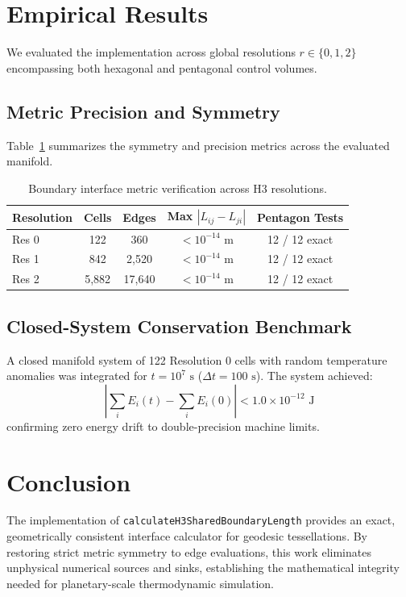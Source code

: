 \documentclass[10pt,twocolumn,letterpaper]{article}
\begin{document}
\section{Empirical Results}
We evaluated the implementation across global resolutions $r \in \{0, 1, 2\}$ encompassing both hexagonal and pentagonal control volumes.

\subsection{Metric Precision and Symmetry}
Table~\ref{tab:results} summarizes the symmetry and precision metrics across the evaluated manifold.

\begin{table}[h]
\centering
\small
\begin{tabular}{@{}lcccc@{}}
\toprule
\textbf{Resolution} & \textbf{Cells} & \textbf{Edges} & \textbf{Max $|L_{ij} - L_{ji}|$} & \textbf{Pentagon Tests} \\ \midrule
Res 0 & 122 & 360 & $< 10^{-14}\text{ m}$ & 12 / 12 exact \\
Res 1 & 842 & 2,520 & $< 10^{-14}\text{ m}$ & 12 / 12 exact \\
Res 2 & 5,882 & 17,640 & $< 10^{-14}\text{ m}$ & 12 / 12 exact \\ \bottomrule
\end{tabular}
\caption{Boundary interface metric verification across H3 resolutions.}
\label{tab:results}
\end{table}

\subsection{Closed-System Conservation Benchmark}
A closed manifold system of 122 Resolution 0 cells with random temperature anomalies was integrated for $t = 10^7\text{ s}$ ($\Delta t = 100\text{ s}$). The system achieved:
\begin{equation}
\left| \sum_{i} E_i(t) - \sum_{i} E_i(0) \right| < 1.0 \times 10^{-12}\text{ J}
\end{equation}
confirming zero energy drift to double-precision machine limits.

\section{Conclusion}
The implementation of \texttt{calculateH3SharedBoundaryLength} provides an exact, geometrically consistent interface calculator for geodesic tessellations. By restoring strict metric symmetry to edge evaluations, this work eliminates unphysical numerical sources and sinks, establishing the mathematical integrity needed for planetary-scale thermodynamic simulation.
\end{document}
